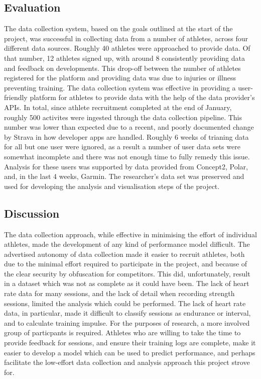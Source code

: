 \subsection{Evaluation}
The data collection system, based on the goals outlined at the start of the project, was successful in collecting data from a number of athletes, across four different data sources. Roughly 40 athletes were approached to provide data. Of that number, 12 athletes signed up, with around 8 consistently providing data and feedback on developments. This drop-off between the number of athletes registered for the platform and providing data was due to injuries or illness preventing training. The data collection system was effective in providing a user-friendly platform for athletes to provide data with the help of the data provider's APIs. In total, since athlete recruitment completed at the end of January, roughly 500 activites were ingested through the data collection pipeline. This number was lower than expected due to a recent, and poorly documented change by Strava in how developer apps are handled. Roughly 6 weeks of trianing data for all but one user were ignored, as a result a number of user data sets were somewhat incomplete and there was not enough time to fully remedy this issue. Analysis for these users was supported by data provided from Concept2, Polar, and, in the last 4 weeks, Garmin. The researcher's data set was preserved and used for developing the analysis and visualisation steps of the project.

\subsection{Discussion}
The data collection approach, while effective in minimising the effort of individual athletes, made the development of any kind of performance model difficult. The advertised autonomy of data collection made it easier to recruit athletes, both due to the minimal effort required to participate in the project, and because of the clear security by obfuscation for competitors. This did, unfortunately, result in a dataset which was not as complete as it could have been. The lack of heart rate data for many sessions, and the lack of detail when recording strength sessions, limited the analysis which could be performed. The lack of heart rate data, in particular, made it difficult to classify sessions as endurance or interval, and to calculate training impulse. For the purposes of research, a more involved group of particpants is required. Athletes who are willing to take the time to provide feedback for sessions, and ensure their training logs are complete, make it easier to develop a model which can be used to predict performance, and perhaps facilitate the low-effort data collection and analysis approach this project strove for. 

